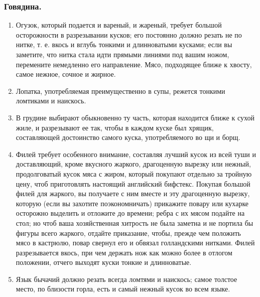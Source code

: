 \subsubsection{Говядина.}
\begin{enumerate}
	\item Огузок, который подается и вареный, и жареный, требует большой осторожности в разрезывании кусков; его постоянно должно резать не по нитке, т. е. вкось и вглубь тонкими и длинноватыми кусками; если вы заметите, что нитка стала идти прямыми линиями под вашим ножом, перемените немедленно его направление. Мясо, подходящее ближе к хвосту, самое нежное, сочное и жирное.
	\item Лопатка, употребляемая преимущественно в супы, режется тонкими ломтиками и наискось.
	\item В грудине выбирают обыкновенно ту часть, которая находится ближе к сухой жиле, и разрезывают ее так, чтобы в каждом куске был хрящик, составляющей достоинство самого куска, употребляемого во щи и борщ.
	\item Филей требует особенного внимание, составляя лучший кусок из всей туши и доставляющий, кроме вкусного жаркого, драгоценную вырезку или нежный, продолговатый кусок мяса с жиром, который покупают отдельно за тройную цену, чтоб приготовлять настоящий английский бифстекс. Покупая большой филей для жаркого, вы получаете с ним вместе и эту драгоценную вырезку, которую (если вы захотите поэкономничать) прикажите повару или кухарке осторожно выделить и отложите до времени; ребра с их мясом подайте на стол; но чтоб ваша хозяйственная хитрость не была заметна и не портила бы фигуры всего жаркого, отдайте приказание, чтобы, прежде чем положить мясо в кастрюлю, повар свернул его и обвязал голландскими нитками. Филей разрезывается вкось, при чем держать нож как можно более в отлогом положении, отчего выходят куски тонкие и длинноватые.
	\item Язык бычачий должно резать всегда ломтями и наискось; самое толстое место, по близости горла, есть и самый нежный кусок во всем языке.
\end{enumerate}

